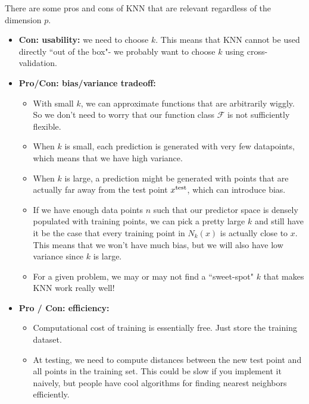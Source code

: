 There are some pros and cons of KNN that are relevant regardless of the dimension $p$. 
\begin{itemize}
	\item \textbf{Con: usability:} we need to choose $k$. This means that KNN cannot be used directly ``out of the box"- we probably want to choose $k$ using cross-validation. 
	\item \textbf{Pro/Con: bias/variance tradeoff: }
	\begin{itemize}
	\item With small $k$, we can approximate functions that are arbitrarily wiggly. So we don't need to worry that our function class $\mathcal{F}$ is not sufficiently flexible. 
	\item When $k$ is small, each prediction is generated with very few datapoints, which means that we have high variance. 
	\item When $k$ is large, a prediction might be generated with points that are actually far away from the test point $x^{\mathrm{test}}$, which can introduce bias. 
	\item If we have enough data points $n$ such that our predictor space is densely populated with training points, we can pick a pretty large $k$ and still have it be the case that every training point in $N_k(x)$ is actually close to $x$. This means that we won't have much bias, but we will also have low variance since $k$ is large.
	\item For a given problem, we may or may not find a ``sweet-spot" $k$ that makes KNN work really well!
	\end{itemize}
	\item \textbf{Pro / Con: efficiency:} 
	\begin{itemize}
	\item Computational cost of training is essentially free. Just store the training dataset. 
	\item At testing, we need to compute distances between the new test point and all points in the training set. This could be slow if you implement it naively, but people have cool algorithms for finding nearest neighbors efficiently. 
	\end{itemize}
\end{itemize}


